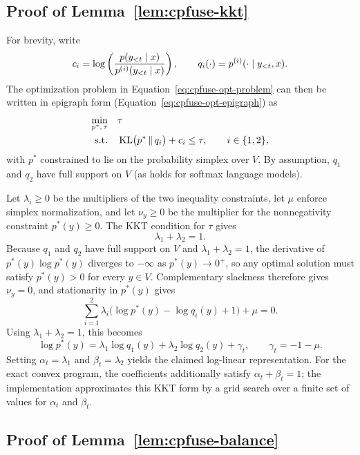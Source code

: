 \subsection{Proof of Lemma~\ref{lem:cpfuse-kkt}}

For brevity, write
\[
c_i
=
\log\left(
\frac{p(y_{<t}\mid x)}
     {p^{(i)}(y_{<t}\mid x)}
\right),
\qquad
q_i(\cdot)
=
p^{(i)}(\cdot \mid y_{<t},x).
\]
The optimization problem in Equation~\eqref{eq:cpfuse-opt-problem} can then be written in epigraph form (Equation~\eqref{eq:cpfuse-opt-epigraph}) as
\begin{equation}
\begin{aligned}
\min_{p^*,\,\tau} \quad & \tau \\
\text{s.t.} \quad &
\operatorname{KL}\bigl(p^* \,\|\, q_i\bigr)
+ c_i
\le \tau,
\qquad i\in\{1,2\},
\end{aligned}
\end{equation}
with \(p^*\) constrained to lie on the probability simplex over \(V\). By assumption, \(q_1\) and \(q_2\) have full support on \(V\) (as holds for softmax language models).

Let \(\lambda_i \ge 0\) be the multipliers of the two inequality constraints, let \(\mu\) enforce simplex normalization, and let \(\nu_y\geq 0\) be the multiplier for the nonnegativity constraint \(p^*(y)\geq 0\). The KKT condition for \(\tau\) gives
\[
\lambda_1+\lambda_2=1.
\]
Because \(q_1\) and \(q_2\) have full support on \(V\) and \(\lambda_1+\lambda_2=1\), the derivative of \(p^*(y)\log p^*(y)\) diverges to \(-\infty\) as \(p^*(y)\to 0^+\), so any optimal solution must satisfy \(p^*(y)>0\) for every \(y\in V\). Complementary slackness therefore gives \(\nu_y=0\), and stationarity in \(p^*(y)\) gives
\[
\sum_{i=1}^2 \lambda_i
\bigl(
\log p^*(y)-\log q_i(y)+1
\bigr)
+ \mu
=0.
\]
Using \(\lambda_1+\lambda_2=1\), this becomes
\[
\log p^*(y)
=
\lambda_1 \log q_1(y)
+
\lambda_2 \log q_2(y)
+
\gamma_t,
\qquad
\gamma_t=-1-\mu.
\]
Setting \(\alpha_t=\lambda_1\) and \(\beta_t=\lambda_2\) yields the claimed log-linear representation. For the exact convex program, the coefficients additionally satisfy \(\alpha_t+\beta_t=1\); the implementation approximates this KKT form by a grid search over a finite set of values for \(\alpha_t\) and \(\beta_t\).

\subsection{Proof of Lemma~\ref{lem:cpfuse-balance}}

